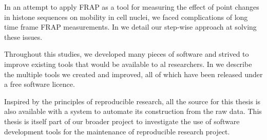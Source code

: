   In an attempt to apply FRAP as a tool for measuring the effect of point
  changes in histone sequences on mobility in cell nuclei,
  we faced complications
  of long time frame FRAP measurements.  In  we detail our
  step-wise approach at solving these issues.

  Throughout this studies, we developed many pieces of software and
  strived to improve existing tools that would be available to al
  researchers.  In  we describe the multiple tools we
  created and improved, all of which have been released under a free
  software licence.

  Inspired by the principles of reproducible research, all the source
  for this thesis is also available with a system to automate its
  construction from the raw data.  This thesis is itself part of our
  broader project to investigate
  the use of software development tools for the maintenance of
  reproducible research project.
